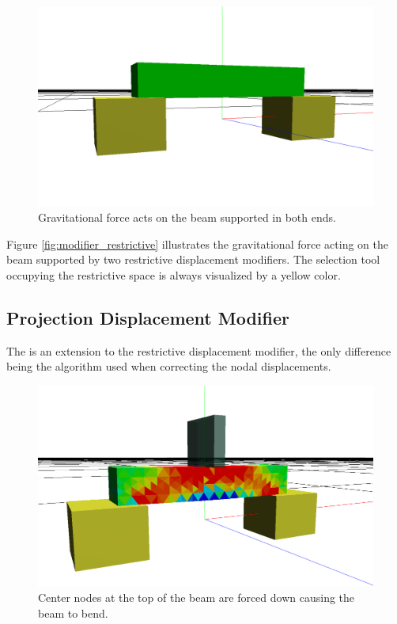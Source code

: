 \begin{figure}
  \centering
  \includegraphics[width=12cm]{./images/helper_tools_modifiers_restrictive.png}
\caption{Gravitational force acts on the beam supported in both ends.}
\label{fig:modifier_restrictive}
\end{figure}

Figure \vref{fig:modifier_restrictive} illustrates the gravitational
force acting on the beam supported by two restrictive displacement
modifiers. The selection tool occupying the restrictive space is
always visualized by a yellow color.  

\subsection{Projection Displacement Modifier}
The  is an extension to the
restrictive displacement modifier, the only difference being 
the algorithm used when correcting the nodal displacements. 

\begin{figure}
  \centering
  \includegraphics[width=12cm]{./images/helper_tools_modifiers_projection.png}
\caption{Center nodes at the top of the beam are forced down
  causing the beam to bend.}
\label{fig:modifier_projection}
\end{figure}

